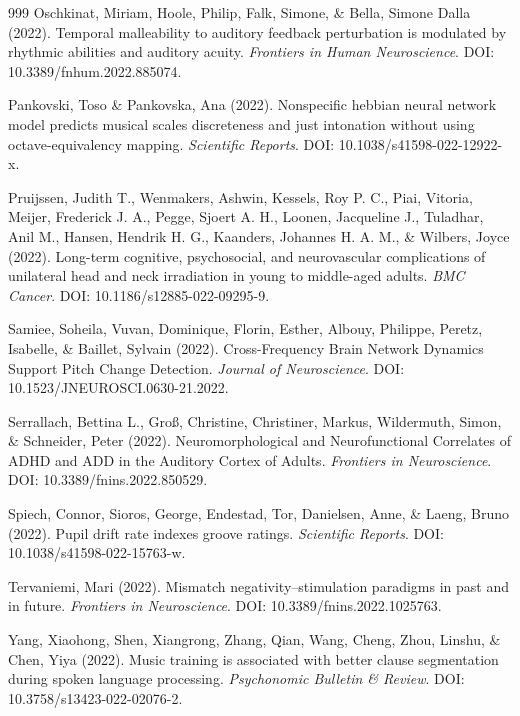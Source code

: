 \documentclass[9pt,onecolumn]{article}
\begin{document}
\begin{thebibliography}{999}
Oschkinat, Miriam, Hoole, Philip, Falk, Simone, \& Bella, Simone Dalla (2022). Temporal malleability to auditory feedback perturbation is modulated by rhythmic abilities and auditory acuity. \textit{Frontiers in Human Neuroscience}. DOI: 10.3389/fnhum.2022.885074.

Pankovski, Toso \& Pankovska, Ana (2022). Nonspecific hebbian neural network model predicts musical scales discreteness and just intonation without using octave-equivalency mapping. \textit{Scientific Reports}. DOI: 10.1038/s41598-022-12922-x.

Pruijssen, Judith T., Wenmakers, Ashwin, Kessels, Roy P. C., Piai, Vitoria, Meijer, Frederick J. A., Pegge, Sjoert A. H., Loonen, Jacqueline J., Tuladhar, Anil M., Hansen, Hendrik H. G., Kaanders, Johannes H. A. M., \& Wilbers, Joyce (2022). Long-term cognitive, psychosocial, and neurovascular complications of unilateral head and neck irradiation in young to middle-aged adults. \textit{BMC Cancer}. DOI: 10.1186/s12885-022-09295-9.

Samiee, Soheila, Vuvan, Dominique, Florin, Esther, Albouy, Philippe, Peretz, Isabelle, \& Baillet, Sylvain (2022). Cross-Frequency Brain Network Dynamics Support Pitch Change Detection. \textit{Journal of Neuroscience}. DOI: 10.1523/JNEUROSCI.0630-21.2022.

Serrallach, Bettina L., Groß, Christine, Christiner, Markus, Wildermuth, Simon, \& Schneider, Peter (2022). Neuromorphological and Neurofunctional Correlates of ADHD and ADD in the Auditory Cortex of Adults. \textit{Frontiers in Neuroscience}. DOI: 10.3389/fnins.2022.850529.

Spiech, Connor, Sioros, George, Endestad, Tor, Danielsen, Anne, \& Laeng, Bruno (2022). Pupil drift rate indexes groove ratings. \textit{Scientific Reports}. DOI: 10.1038/s41598-022-15763-w.

Tervaniemi, Mari (2022). Mismatch negativity–stimulation paradigms in past and in future. \textit{Frontiers in Neuroscience}. DOI: 10.3389/fnins.2022.1025763.

Yang, Xiaohong, Shen, Xiangrong, Zhang, Qian, Wang, Cheng, Zhou, Linshu, \& Chen, Yiya (2022). Music training is associated with better clause segmentation during spoken language processing. \textit{Psychonomic Bulletin \& Review}. DOI: 10.3758/s13423-022-02076-2.


\end{thebibliography}
\end{document}
